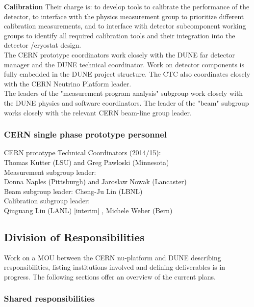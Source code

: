 {\bf Calibration}  Their charge is:  to develop tools to calibrate the performance of the detector, to interface with the physics measurement group to prioritize different calibration measurements, and to interface with detector subcomponent working groups to identify all required calibration tools and their integration into the detector /cryostat design.\\


The CERN prototype coordinators work closely with the DUNE far detector manager and the DUNE technical coordinator. 
Work on detector components is fully embedded in the DUNE project structure. The CTC also coordinates closely with the CERN Neutrino Platform
leader.\\
The leaders of the "measurement program analysis" subgroup work closely with the DUNE physics and software coordinators.
The leader of the "beam" subgroup works closely with the relevant CERN beam-line group leader.


\subsubsection{CERN single phase prototype personnel}

CERN prototype  Technical Coordinators (2014/15):\\
 Thomas Kutter (LSU) and Greg Pawloski (Minnesota)\\
 
 Measurement subgroup leader: \\
 \indent Donna Naples (Pittsburgh) and Jaroslaw Nowak (Lancaster)\\
 
 Beam subgroup leader: Cheng-Ju Lin (LBNL)\\

Calibration subgroup leader: \\
\indent  Qiuguang Liu (LANL) [interim] , Michele Weber (Bern)\\


\subsection{Division of Responsibilities}

Work on a MOU between the CERN nu-platform and DUNE describing responsibilities, listing institutions involved and defining deliverables is in progress. The following sections offer an overview of the current plans.

\subsubsection{Shared responsibilities}

